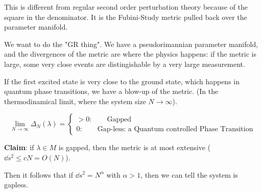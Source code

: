 \documentclass[main.tex]{subfiles}
\begin{document}
This is different from regular second order perturbation theory because of the square in the denominator. It is the Fubini-Study metric pulled back over the parameter manifold.

We want to do the "GR thing". We have a pseudorimannian parameter manifold, and the divergences of the metric are where the physics happens: if the metric is large, some very close events are distingishable by a very large measurement.

If the first excited state is very close to the ground state, which happens in quantum phase transitions, we have a blow-up of the metric. (In the thermodinamical limit, where the system size \(N \rightarrow \infty\)).

\begin{equation}
   \lim _ {N \rightarrow \infty} \Delta_N(\lambda) = \begin{cases}
     > 0: \qquad \text{Gapped}  \\
     0: \qquad \text{Gap-less: a Quantum controlled Phase Transition}
 \end{cases}
\end{equation}

\textbf{Claim}: if \(\lambda \in M \) is gapped, then the metric is at most extensive (\(\dd{s^2} \leq cN = O(N) \)).

Then it follows that if \(\dd{s^2} = N^\alpha \) with \(\alpha>1\), then we can tell the system is gapless.
\end{document}
